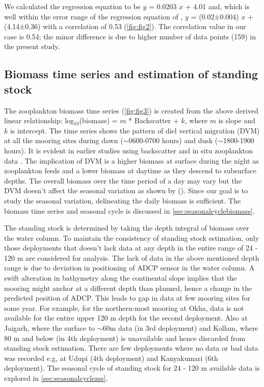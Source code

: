 \documentclass{article}
\begin{document}
	We calculated the regression equation to be $y$ = 0.0203 $x$  + 4.01 and, which is well within the error range of the regression equation of \citep{aparna2022seasonal}, $y$ = (0.02±0.004) $x$ + (4.14±0.36) with a correlation of 0.53 (\cref{fig:fig2}). The correlation value in our case is 0.54; the minor difference is  due to higher number of data points (159) in the present study. 
	
	\subsection{Biomass time series and estimation of standing stock}
	
	The zooplankton biomass time series (\cref{fig:fig3}) is created from the above derived linear relationship: log$_{10}$(biomass) = $m$ * Backscatter + $k$, where $m$ is slope and $k$ is intercept. The time series shows the pattern of diel vertical migration (DVM) at all the mooring sites during dawn ($\sim$0600-0700 hours) and dusk ($\sim$1800-1900 hours). It is evident in earlier studies using backscatter \citep{ashjian2002distribution, smith2005mesozooplankton, inoue2016diel,ursella2018evidence} and in situ zooplankton data \citep{padmavati1998vertical}. The implication of DVM is a higher biomass at surface during the night as zooplankton feeds and a lower biomass at daytime as they descend to subsurface depths. The overall biomass over the time period of a day may vary but the DVM doesn't affect the seasonal variation as shown by (\citep{jiang2007temporal,aparna2022seasonal}). Since our goal is to study the seasonal variation, delineating the daily biomass is sufficient. The biomass time series and seasonal cycle is discussed in \autoref{sec:seasonalcyclebiomass}.
	
	The standing stock is determined by taking the depth integral of biomass over the water column. To maintain the consistency of standing stock estimation, only those deployments that doesn't lack data at any depth in the entire range of 24 - 120 m are considered for analysis. The lack of data in the above mentioned depth range is due to deviation in positioning of ADCP sensor in the water column. A swift alteration in bathymetry along the continental slope implies that the mooring might anchor at a different depth than planned, hence a change in the predicted position of ADCP. This leads to gap in data at few mooring sites for some year. For example, for the northern-most mooring at Okha, data is not available for the entire upper 120 m depth for the second deployment. Also at Jaigarh, where the surface to $\sim$60m data (in 3rd deployment) and Kollam, where 80 m and below (in 4th deployment) is unavailable and hence discarded from standing stock estimation. There are few deployments where no data or bad data was recorded e.g, at Udupi (4th deployment) and Kanyakumari (6th deployment). The seasonal cycle of standing stock for 24 - 120 m available data is explored in \autoref{sec:seasonalcyclezss}.
	
\end{document}
